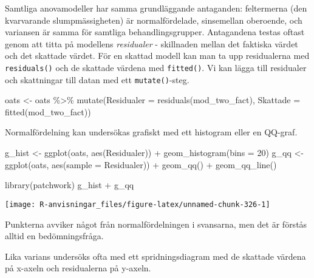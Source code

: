 \documentclass[
]{book}
\newenvironment{Shaded}{\begin{snugshade}}{\end{snugshade}}
\newcommand{\AttributeTok}[1]{\textcolor[rgb]{0.77,0.63,0.00}{#1}}
\newcommand{\DecValTok}[1]{\textcolor[rgb]{0.00,0.00,0.81}{#1}}
\newcommand{\FunctionTok}[1]{\textcolor[rgb]{0.00,0.00,0.00}{#1}}
\newcommand{\NormalTok}[1]{#1}
\newcommand{\OtherTok}[1]{\textcolor[rgb]{0.56,0.35,0.01}{#1}}
\newcommand{\SpecialCharTok}[1]{\textcolor[rgb]{0.00,0.00,0.00}{#1}}
\theoremstyle{definition}
\theoremstyle{definition}
\theoremstyle{definition}
\theoremstyle{definition}
\theoremstyle{remark}
\begin{document}
Samtliga anovamodeller har samma grundläggande antaganden: feltermerna (den kvarvarande slumpmässigheten) är normalfördelade, sinsemellan oberoende, och variansen är samma för samtliga behandlingsgrupper. Antagandena testas oftast genom att titta på modellens \emph{residualer} - skillnaden mellan det faktiska värdet och det skattade värdet. För en skattad modell kan man ta upp residualerna med \texttt{residuals()} och de skattade värdena med \texttt{fitted()}. Vi kan lägga till residualer och skattningar till datan med ett \texttt{mutate()}-steg.

\begin{Shaded}
\begin{Highlighting}[]
\NormalTok{oats }\OtherTok{\textless{}{-}}\NormalTok{ oats }\SpecialCharTok{\%\textgreater{}\%} 
  \FunctionTok{mutate}\NormalTok{(}\AttributeTok{Residualer =} \FunctionTok{residuals}\NormalTok{(mod\_two\_fact),}
         \AttributeTok{Skattade =} \FunctionTok{fitted}\NormalTok{(mod\_two\_fact))}
\end{Highlighting}
\end{Shaded}

Normalfördelning kan undersökas grafiskt med ett histogram eller en QQ-graf.

\begin{Shaded}
\begin{Highlighting}[]
\NormalTok{g\_hist }\OtherTok{\textless{}{-}} \FunctionTok{ggplot}\NormalTok{(oats, }\FunctionTok{aes}\NormalTok{(Residualer)) }\SpecialCharTok{+} \FunctionTok{geom\_histogram}\NormalTok{(}\AttributeTok{bins =} \DecValTok{20}\NormalTok{)}
\NormalTok{g\_qq }\OtherTok{\textless{}{-}} \FunctionTok{ggplot}\NormalTok{(oats, }\FunctionTok{aes}\NormalTok{(}\AttributeTok{sample =}\NormalTok{ Residualer)) }\SpecialCharTok{+} \FunctionTok{geom\_qq}\NormalTok{() }\SpecialCharTok{+} \FunctionTok{geom\_qq\_line}\NormalTok{()}

\FunctionTok{library}\NormalTok{(patchwork)}
\NormalTok{g\_hist }\SpecialCharTok{+}\NormalTok{ g\_qq}
\end{Highlighting}
\end{Shaded}

\begin{center}\texttt{[image: R-anvisningar\_files/figure-latex/unnamed-chunk-326-1]} \end{center}

Punkterna avviker något från normalfördelningen i svansarna, men det är förstås alltid en bedömningsfråga.

Lika varians undersöks ofta med ett spridningsdiagram med de skattade värdena på x-axeln och residualerna på y-axeln.
\end{document}
